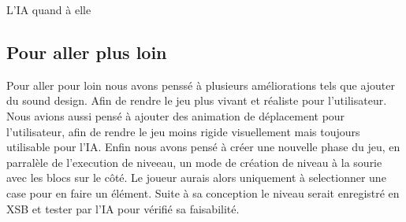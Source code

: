 \documentclass[a4paper,12pt]{article} %
\begin{document}
L'IA quand à elle 

\subsection{Pour aller plus loin}

Pour aller pour loin nous avons penssé à plusieurs améliorations tels que ajouter du sound design.
Afin de rendre le jeu plus vivant et réaliste pour l'utilisateur.
Nous avions aussi pensé à ajouter des animation de déplacement pour l'utilisateur, afin de rendre le jeu moins rigide visuellement mais toujours utilisable pour l'IA.
Enfin nous avons pensé à créer une nouvelle phase du jeu, en parralèle de l'execution de niveeau, un mode de création de niveau à la sourie avec les blocs sur le côté.
Le joueur aurais alors uniquement à selectionner une case pour en faire un élément.
Suite à sa conception le niveau serait enregistré en XSB et tester par l'IA pour vérifié sa faisabilité.
\end{document}
